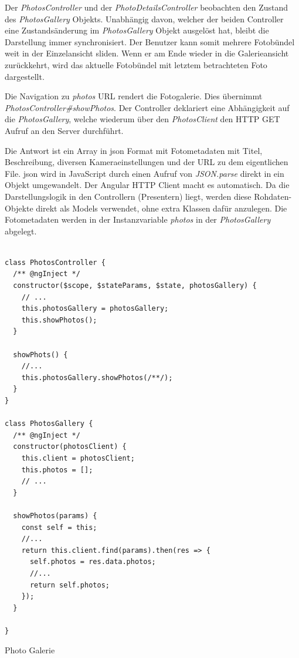 Der \textit{PhotosController} und der \textit{PhotoDetailsController} beobachten den Zustand des \textit{PhotosGallery} Objekts. Unabhängig davon, welcher der beiden Controller eine Zustandsänderung im \textit{PhotosGallery} Objekt ausgelöst hat, bleibt die Darstellung immer synchronisiert. Der Benutzer kann somit mehrere Fotobündel weit in der Einzelansicht sliden. Wenn er am Ende wieder in die Galerieansicht zurückkehrt, wird das aktuelle Fotobündel mit letztem betrachteten Foto dargestellt.

Die Navigation zu \textit{\/photos} URL rendert die Fotogalerie. Dies übernimmt  \textit{PhotosController\#showPhotos}. Der Controller deklariert eine Abhängigkeit auf die \textit{PhotosGallery}, welche wiederum über den \textit{PhotosClient} den HTTP GET Aufruf an den Server durchführt.

Die Antwort ist ein Array in \gls{json} Format mit Fotometadaten mit Titel, Beschreibung, diversen Kameraeinstellungen und der URL zu dem eigentlichen File. \gls{json} wird in JavaScript durch einen Aufruf von \textit{JSON.parse} direkt in ein Objekt umgewandelt. Der Angular HTTP Client macht es automatisch. Da die Darstellungslogik in den Controllern (Presentern) liegt, werden diese Rohdaten-Objekte direkt als Models verwendet, ohne extra Klassen dafür anzulegen. Die Fotometadaten werden in der Instanzvariable \textit{photos} in der \textit{PhotosGallery} abgelegt.


\begin{listing}[H]
\begin{verbatim}

class PhotosController {
  /** @ngInject */
  constructor($scope, $stateParams, $state, photosGallery) {
    // ...
    this.photosGallery = photosGallery;
    this.showPhotos();
  }

  showPhots() {
    //...
    this.photosGallery.showPhotos(/**/);
  }
}

class PhotosGallery {
  /** @ngInject */
  constructor(photosClient) {
    this.client = photosClient;
    this.photos = [];
    // ...
  }

  showPhotos(params) {
    const self = this;
    //...
    return this.client.find(params).then(res => {
      self.photos = res.data.photos;
      //...
      return self.photos;
    });
  }

}

\end{verbatim}
\caption{Photo Galerie}
\label{lst:photo_gallery}
\end{listing}

